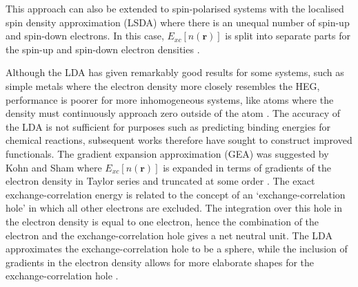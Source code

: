\documentclass[11pt, twoside]{report}
\begin{document}
This approach can also be extended to spin-polarised systems with the localised spin density approximation (LSDA) where there is an unequal number of spin-up and spin-down electrons. In this case, $E_{xc}[n(\boldsymbol{r})]$ is split into separate parts for the spin-up and spin-down electron densities \cite{Prasad_ch3}.

Although the LDA has given remarkably good results for some systems, such as simple metals where the electron density more closely resembles the HEG, performance is poorer for more inhomogeneous systems, like atoms where the density must continuously approach zero outside of the atom \cite{RichardMartin_Ch8}. The accuracy of the LDA is not sufficient for purposes such as predicting binding energies for chemical reactions, subsequent works therefore have sought to construct improved functionals. 
The gradient expansion approximation (GEA) was suggested by Kohn and Sham \cite{Kohn_Sham1965} where $E_{xc}[n(\boldsymbol{r})]$ is expanded in terms of gradients of the electron density in Taylor series and truncated at some order \cite{Prasad_ch3}.
The exact exchange-correlation energy is related to the concept of an `exchange-correlation hole' in which all other electrons are excluded. The integration over this hole in the electron density is equal to one electron, hence the combination of the electron and the exchange-correlation hole gives a net neutral unit. The LDA approximates the exchange-correlation hole to be a sphere, while the inclusion of gradients in the electron density allows for more elaborate shapes for the exchange-correlation hole \cite{RichardMartin_Ch7}.
\end{document}
